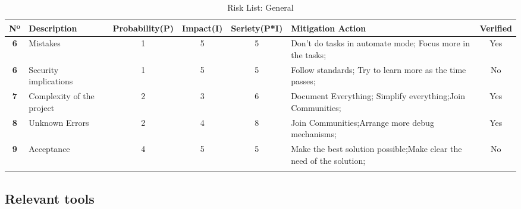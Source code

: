     \begin{longtable}{|c|p{2cm}|c|c|c|p{2cm}|c|} 
        \hline
     \textbf{Nº} & 
     \textbf{Description} & 
     \textbf{Probability(P)} & 
     \textbf{Impact(I)} & 
     \textbf{Seriety(P*I)} & 
     \textbf{Mitigation Action} & 
     \textbf{Verified}  
     \\ \hline
    \endfirsthead
    \textbf{6} 
    & 
    Mistakes
    & 1 
    & 5 
    & 5 
    & Don't do tasks in automate mode; Focus more in the tasks;
    & Yes
    \\ \hline

    \textbf{6} 
    & 
    Security implications
    & 1 
    & 5 
    & 5 
    & Follow standards; Try to learn more as the time passes;
    & No
    \\ \hline

    \textbf{7} 
    & 
    Complexity of the project
    & 2 
    & 3 
    & 6 
    & Document Everything; Simplify everything;Join Communities;
    & Yes
    \\ \hline

    \textbf{8} 
    & 
    Unknown Errors
    & 2 
    & 4 
    & 8 
    & Join Communities;Arrange more debug mechanisms;
    & Yes
    \\ \hline

    \textbf{9} 
    & 
    Acceptance
    & 4 
    & 5 
    & 5 
    & Make the best solution possible;Make clear the need of the solution;
    & No
    \\ \hline

    \caption{Risk List: General} \label{tab:activity_schedule} 

\end{longtable}

\subsection{Relevant tools}


